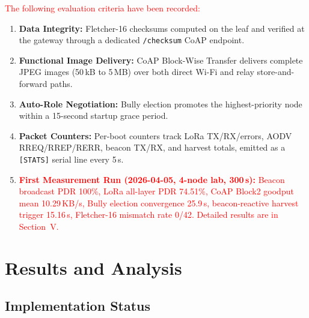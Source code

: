 \documentclass[12pt,a4paper]{article}
\DeclareRobustCommand{\changed}[1]{\textcolor{red}{#1}}
\begin{document}
\changed{The following evaluation criteria have been recorded:}

\begin{enumerate}
    \item \textbf{Data Integrity:} Fletcher-16 checksums computed on the leaf and verified at the gateway through a dedicated \texttt{/checksum} CoAP endpoint.

    \item \textbf{Functional Image Delivery:} CoAP Block-Wise Transfer delivers complete JPEG images (50\,kB to 5\,MB) over both direct Wi-Fi and relay store-and-forward paths.

    \item \textbf{Auto-Role Negotiation:} Bully election promotes the highest-priority node within a 15-second startup grace period.

    \item \textbf{Packet Counters:} Per-boot counters track LoRa TX/RX/errors, AODV RREQ/RREP/RERR, beacon TX/RX, and harvest totals, emitted as a \texttt{[STATS]} serial line every 5\,s.

    \item \changed{\textbf{First Measurement Run (2026-04-05, 4-node lab, 300\,s):} Beacon broadcast PDR 100\%, LoRa all-layer PDR 74.51\%, CoAP Block2 goodput mean 10.29\,KB/s, Bully election convergence 25.9\,s, beacon-reactive harvest trigger 15.16\,s, Fletcher-16 mismatch rate 0/42. Detailed results are in Section~V.}
\end{enumerate}

\newpage



\section{Results and Analysis}

\subsection{Implementation Status}
\end{document}
